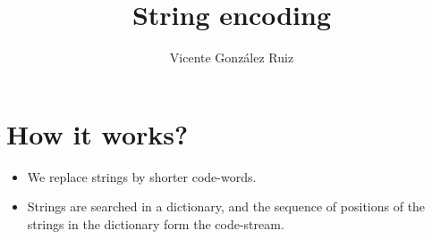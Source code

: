 
\title{String encoding}

\author{Vicente González Ruiz}

\maketitle

\section{How it works?}

\begin{itemize}
\item We replace strings by shorter code-words.
\item Strings are searched in a dictionary, and the sequence of positions of the strings in the dictionary form the code-stream.
\end{itemize}
